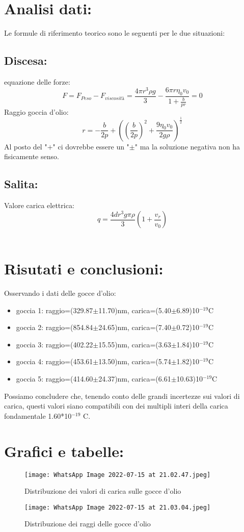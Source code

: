 \documentclass{article}
\begin{document}
\section{Analisi dati:}
Le formule di riferimento teorico sono le seguenti per le due situazioni:
\subsection{Discesa:}
equazione delle forze:
\begin{equation}
    F=F_{Peso}-F_{viscosità}=\frac{4\pi r^3 \rho g}{3}-\frac{6\pi r \eta_0 v_0}{1+\frac{b}{pr}}=0
\end{equation}
Raggio goccia d'olio:
\begin{equation}
    r=-\frac{b}{2p}+((\frac{b}{2p})^2+\frac{9 \eta_0 v_0}{2g\rho})^\frac{1}{2}
\end{equation}
Al posto del "$+$" ci dovrebbe essere un "$\pm$" ma la soluzione negativa non ha fisicamente senso.
\subsection{Salita:}
Valore carica elettrica:
\begin{equation}
    q=\frac{4dr^3g\pi\rho}{3}(1+\frac{v_r}{v_0})
\end{equation}
~
\section{Risutati e conclusioni:}
Osservando i dati delle gocce d'olio:
\begin{itemize}
    \item goccia 1: raggio=(329.87$\pm$11.70)nm, carica=(5.40$\pm$6.89)10$^{-19}$C
    \item goccia 2: raggio=(854.84$\pm$24.65)nm, carica=(7.40$\pm$0.72)10$^{-19}$C
    \item goccia 3: raggio=(402.22$\pm$15.55)nm, carica=(3.63$\pm$1.84)10$^{-19}$C
    \item goccia 4: raggio=(453.61$\pm$13.50)nm, carica=(5.74$\pm$1.82)10$^{-19}$C
    \item goccia 5: raggio=(414.60$\pm$24.37)nm, carica=(6.61$\pm$10.63)10$^{-19}$C
\end{itemize}
Possiamo concludere che, tenendo conto delle grandi incertezze sui valori di carica, questi valori siano compatibili con dei multipli interi della carica fondamentale 1.60*10$^{-19}$ C.
~
\section{Grafici e tabelle:}
\begin{figure}[h!]
    \centering
    \texttt{[image: WhatsApp Image 2022-07-15 at 21.02.47.jpeg]}
    \caption{Distribuzione dei valori di carica sulle gocce d'olio}
    \label{figura1}
\end{figure}
\begin{figure}[h!]
    \centering
    \texttt{[image: WhatsApp Image 2022-07-15 at 21.03.04.jpeg]}
    \caption{Distribuzione dei raggi delle gocce d'olio}
    \label{figura1}
\end{figure}
\end{document}
